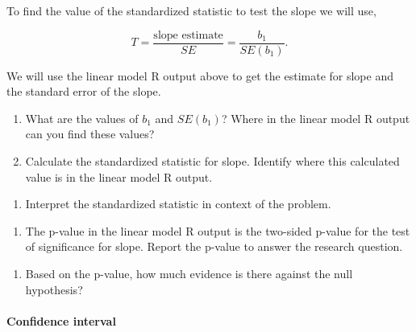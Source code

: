 \documentclass[
]{report}
\providecommand{\tightlist}{%
  \setlength{\itemsep}{0pt}\setlength{\parskip}{0pt}}
\begin{document}
To find the value of the standardized statistic to test the slope we will use,

\[
T = \frac{\mbox{slope estimate}}{SE} = \frac{b_1}{SE(b_1)}.
\]

We will use the linear model R output above to get the estimate for slope and the standard error of the slope.

\begin{enumerate}
\def\labelenumi{\arabic{enumi}.}
\setcounter{enumi}{6}
\item
  What are the values of \(b_1\) and \(SE(b_1)\)? Where in the linear model R output can you find these values?
  \vspace{0.5in}
\item
  Calculate the standardized statistic for slope. Identify where this calculated value is in the linear model R output.
\end{enumerate}

\newpage

\begin{enumerate}
\def\labelenumi{\arabic{enumi}.}
\setcounter{enumi}{8}
\tightlist
\item
  Interpret the standardized statistic in context of the problem.
\end{enumerate}

\vspace{0.8in}

\begin{enumerate}
\def\labelenumi{\arabic{enumi}.}
\setcounter{enumi}{9}
\tightlist
\item
  The p-value in the linear model R output is the two-sided p-value for the test of significance for slope. Report the p-value to answer the research question.
\end{enumerate}

\vspace{0.5in}

\begin{enumerate}
\def\labelenumi{\arabic{enumi}.}
\setcounter{enumi}{10}
\tightlist
\item
  Based on the p-value, how much evidence is there against the null hypothesis?
\end{enumerate}

\vspace{0.5in}

\hypertarget{confidence-interval-3}{%
\paragraph*{Confidence interval}\label{confidence-interval-3}}
\end{document}
